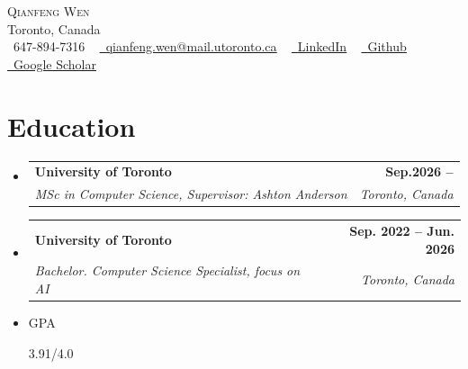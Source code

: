 \documentclass[letterpaper,11pt]{article}
\makeatletter
\newcommand{\resumeItem}[1]{
  \item\small{
    {#1 \vspace{-2pt}}
  }
}
\newcommand{\resumeSubheading}[4]{
  \vspace{-2pt}\item
    \begin{tabular*}{1.0\textwidth}[t]{l@{\extracolsep{\fill}}r}
      \textbf{#1} & \textbf{\small #2} \\
      \textit{\small#3} & \textit{\small #4} \\
    \end{tabular*}\vspace{-7pt}
}
\newcommand{\resumeSubHeadingListStart}{\begin{itemize}[leftmargin=0.0in, label={}]}
\newcommand{\resumeSubHeadingListEnd}{\end{itemize}}
\makeatother
\begin{document}

\begin{center}
    {\LARGE \scshape Qianfeng Wen} \\ \vspace{1pt}
    Toronto, Canada \\ \vspace{1pt}
    \small \raisebox{-0.1\height}\faPhone\ 647-894-7316 ~ \href{mailto:qianfeng.wen@mail.utoronto.ca}{\raisebox{-0.2\height}\faEnvelope\  \underline{qianfeng.wen@mail.utoronto.ca}} ~ 
    \href{https://linkedin.com/in/qianfeng-wen-23a127290/}{\raisebox{-0.2\height}\faLinkedin\ \underline{LinkedIn}}  ~
    \href{https://github.com/QianfengWen/}{\raisebox{-0.2\height}\faGithub\ \underline{Github}} ~
    \href{https://scholar.google.com/citations?user=auhnI1MAAAAJ}{\raisebox{-0.2\height}\faGraduationCap\ \underline{Google Scholar}}
    \vspace{-8pt}
\end{center}



\section{Education}
  \resumeSubHeadingListStart
    \resumeSubheading
        {University of Toronto}{Sep.2026 -- }
        {MSc in Computer Science, Supervisor: Ashton Anderson}{Toronto, Canada}
    \resumeSubheading
      {University of Toronto}{Sep. 2022 -- Jun. 2026}
      {Bachelor. Computer Science Specialist, focus on AI}{Toronto, Canada}
    \resumeItem{GPA}
    {3.91/4.0}
  \resumeSubHeadingListEnd
\end{document}
